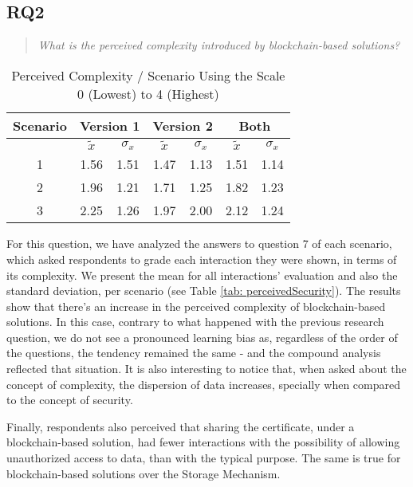 \subsection{RQ2}

\begin{quote}
\textit{What is the perceived complexity introduced by blockchain-based solutions?}
\end{quote}

\begin{table}[htb]
    \centering
    \caption{Perceived Complexity / Scenario Using the Scale 0 (Lowest) to 4 (Highest)}
    \label{tab: perceivedComplexity}
    \begin{tabular}{c|cccc|cc}
    \hline 
    Scenario & \multicolumn{2}{c}{\bf Version 1} & \multicolumn{2}{c}{\bf Version 2} \vrule & \multicolumn{2}{c}{\bf Both} \\
    \hline
     & $\tilde{x}$ & $\sigma_{x}$ & $\tilde{x}$ & $\sigma_{x}$ & $\tilde{x}$ & $\sigma_{x}$ \\
    \hline
    1 & 1.56 & 1.51 & 1.47 & 1.13 & 1.51 & 1.14 \\
    2 & 1.96 & 1.21 & 1.71 & 1.25 & 1.82 & 1.23 \\
    3 & 2.25 & 1.26 & 1.97 & 2.00 & 2.12 & 1.24 \\
    \hline
    \end{tabular}
\end{table}

For this question, we have analyzed the answers to question 7 of each scenario, which asked respondents to grade each interaction they were shown, in terms of its complexity. We present the mean for all interactions' evaluation and also the standard deviation, per scenario (see Table \ref{tab: perceivedSecurity}). The results show that there's an increase in the perceived complexity of blockchain-based solutions. In this case, contrary to what happened with the previous research question, we do not see a pronounced learning bias as, regardless of the order of the questions, the tendency remained the same - and the compound analysis reflected that situation. It is also interesting to notice that, when asked about the concept of complexity, the dispersion of data increases, specially when compared to the concept of security.

Finally, respondents also perceived that sharing the certificate, under a blockchain-based solution, had fewer interactions with the possibility of allowing unauthorized access to data, than with the typical purpose. The same is true for blockchain-based solutions over the Storage Mechanism.

